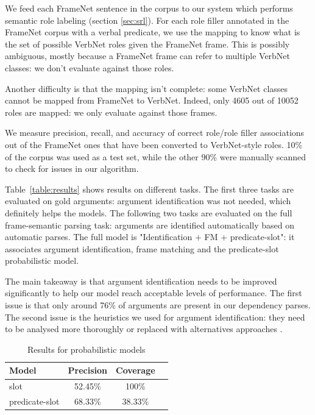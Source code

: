 We feed each FrameNet sentence in the corpus to our system which performs
semantic role labeling (section \ref{sec:srl}). For each role filler annotated
in the FrameNet corpus with a verbal predicate, we use the mapping to know what
is the set of possible VerbNet roles given the FrameNet frame. This is possibly
ambiguous, mostly because a FrameNet frame can refer to multiple VerbNet
classes: we don't evaluate against those roles.

Another difficulty is that the mapping isn't complete: some VerbNet classes
cannot be mapped from FrameNet to VerbNet. Indeed, only 4605 out of 10052 roles
are mapped: we only evaluate against those frames.

We measure precision, recall, and accuracy of correct role/role filler
associations out of the FrameNet ones that have been converted to VerbNet-style
roles. 10\% of the corpus was used as a test set, while the other 90\% were
manually scanned to check for issues in our algorithm.

Table~\ref{table:results} shows results on different tasks. The first three
tasks are evaluated on gold arguments: argument identification was not needed, which
definitely helps the models. The following two tasks are evaluated on the full
frame-semantic parsing task: arguments are identified automatically based on
automatic parses. The full model is "Identification + FM + predicate-slot": it
associates argument identification, frame matching and the predicate-slot
probabilistic model.

The main takeaway is that argument identification needs to be improved
significantly to help our model reach acceptable levels of performance. The
first issue is that only around 76\% of arguments are present in our dependency
parses. The second issue is the heuristics we used for argument identification:
they need to be analysed more thoroughly or replaced with alternatives
approaches \citep{abend2009unsupervised}.

\begin{table}[ht]
    \centering
    \begin{tabular}{lccc}
        \toprule
        Model          & Precision & Coverage \\
        \midrule
        slot           & 52.45\% & 100\% \\
        predicate-slot & 68.33\% & 38.33\% \\
        \bottomrule
    \end{tabular}
    \caption{\protect\centering\label{table:probabilisticresults}Results for probabilistic models}
\end{table}

